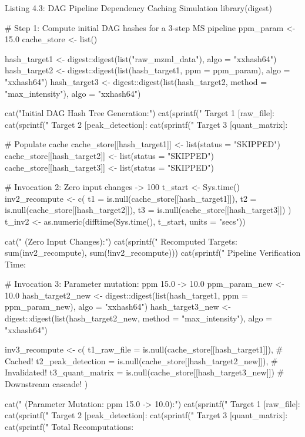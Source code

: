 \documentclass[11pt,twoside,openright]{book}
\begin{document}
\begin{rchunk}{Listing 4.3: DAG Pipeline Dependency Caching Simulation}
library(digest)

# Step 1: Compute initial DAG hashes for a 3-step MS pipeline
ppm_param <- 15.0
cache_store <- list()

hash_target1 <- digest::digest(list("raw_mzml_data"), algo = "xxhash64")
hash_target2 <- digest::digest(list(hash_target1, ppm = ppm_param), algo = "xxhash64")
hash_target3 <- digest::digest(list(hash_target2, method = "max_intensity"), algo = "xxhash64")

cat("Initial DAG Hash Tree Generation:\n")
cat(sprintf("  Target 1 [raw_file]:       %
cat(sprintf("  Target 2 [peak_detection]: %
cat(sprintf("  Target 3 [quant_matrix]:   %

# Populate cache
cache_store[[hash_target1]] <- list(status = "SKIPPED")
cache_store[[hash_target2]] <- list(status = "SKIPPED")
cache_store[[hash_target3]] <- list(status = "SKIPPED")

# Invocation 2: Zero input changes -> 100%
t_start <- Sys.time()
inv2_recompute <- c(
  t1 = is.null(cache_store[[hash_target1]]),
  t2 = is.null(cache_store[[hash_target2]]),
  t3 = is.null(cache_store[[hash_target3]])
)
t_inv2 <- as.numeric(difftime(Sys.time(), t_start, units = "secs"))

cat(" (Zero Input Changes):\n")
cat(sprintf("  Recomputed Targets: %
            sum(inv2_recompute), sum(!inv2_recompute)))
cat(sprintf("  Pipeline Verification Time: %

# Invocation 3: Parameter mutation: ppm 15.0 -> 10.0
ppm_param_new <- 10.0
hash_target2_new <- digest::digest(list(hash_target1, ppm = ppm_param_new), algo = "xxhash64")
hash_target3_new <- digest::digest(list(hash_target2_new, method = "max_intensity"), algo = "xxhash64")

inv3_recompute <- c(
  t1_raw_file       = is.null(cache_store[[hash_target1]]),     # Cached!
  t2_peak_detection = is.null(cache_store[[hash_target2_new]]), # Invalidated!
  t3_quant_matrix   = is.null(cache_store[[hash_target3_new]])  # Downstream cascade!
)

cat(" (Parameter Mutation: ppm 15.0 -> 10.0):\n")
cat(sprintf("  Target 1 [raw_file]:       %
cat(sprintf("  Target 2 [peak_detection]: %
cat(sprintf("  Target 3 [quant_matrix]:   %
cat(sprintf("  Total Recomputations: %
\end{rchunk}
\end{document}
